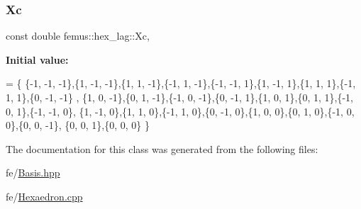 \subsubsection{\texorpdfstring{Xc}{Xc}}
{\footnotesize\ttfamily const double femus\+::hex\+\_\+lag\+::\+Xc\hspace{0.3cm}{\ttfamily [static]}, {\ttfamily [protected]}}

{\bfseries Initial value\+:}
\begin{DoxyCode}
= \{
    \{-1, -1, -1\},\{1, -1, -1\},\{1, 1, -1\},\{-1, 1, -1\},\{-1, -1, 1\},\{1, -1, 1\},\{1, 1, 1\},\{-1, 1, 1\},\{0, -1, -1\}
      ,
    \{1, 0, -1\},\{0, 1, -1\},\{-1, 0, -1\},\{0, -1, 1\},\{1, 0, 1\},\{0, 1, 1\},\{-1, 0, 1\},\{-1, -1, 0\},
    \{1, -1, 0\},\{1, 1, 0\},\{-1, 1, 0\},\{0, -1, 0\},\{1, 0, 0\},\{0, 1, 0\},\{-1, 0, 0\},\{0, 0, -1\},
    \{0, 0, 1\},\{0, 0, 0\}
  \}
\end{DoxyCode}


The documentation for this class was generated from the following files\+:\begin{DoxyCompactItemize}
\item 
fe/\mbox{\hyperlink{_basis_8hpp}{Basis.\+hpp}}\item 
fe/\mbox{\hyperlink{_hexaedron_8cpp}{Hexaedron.\+cpp}}\end{DoxyCompactItemize}
